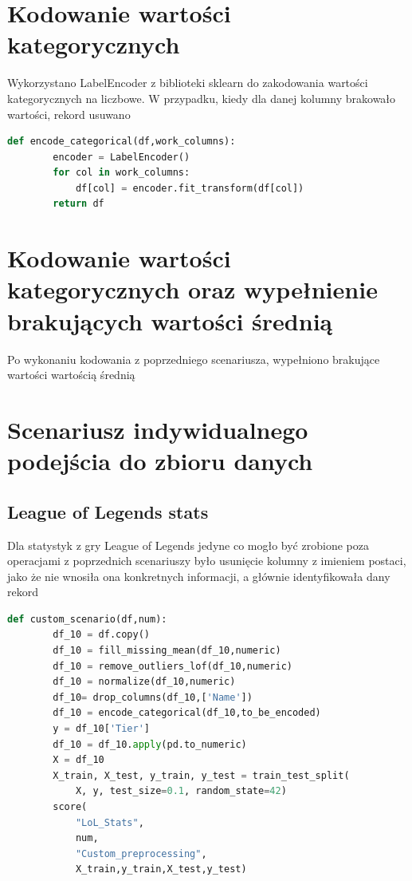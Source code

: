 \documentclass{book}
\begin{document}
\section{Kodowanie wartości kategorycznych}
Wykorzystano LabelEncoder z biblioteki sklearn do 
zakodowania wartości kategorycznych na liczbowe. 
W przypadku, kiedy dla danej kolumny brakowało wartości, 
rekord usuwano

\begin{lstlisting}[language=Python, caption={Usuwanie wartości 
    odstających}, captionpos=b]
    def encode_categorical(df,work_columns):
        encoder = LabelEncoder()
        for col in work_columns:
            df[col] = encoder.fit_transform(df[col])
        return df
\end{lstlisting}

\section{Kodowanie wartości kategorycznych oraz wypełnienie 
brakujących wartości średnią}
Po wykonaniu kodowania z poprzedniego scenariusza, 
wypełniono brakujące wartości wartością średnią
\section{Scenariusz indywidualnego podejścia do zbioru danych}
\subsection{League of Legends stats}
Dla statystyk z gry League of Legends jedyne co mogło być zrobione 
poza operacjami z poprzednich scenariuszy było usunięcie kolumny z 
imieniem postaci, jako że nie wnosiła ona konkretnych informacji, 
a głównie identyfikowała dany rekord

\begin{lstlisting}[language=Python, caption={Indywidualny 
    scenariusz dla zestawu danych LoL Stats}, captionpos=b]
    def custom_scenario(df,num):
        df_10 = df.copy()
        df_10 = fill_missing_mean(df_10,numeric)
        df_10 = remove_outliers_lof(df_10,numeric)
        df_10 = normalize(df_10,numeric)
        df_10= drop_columns(df_10,['Name'])
        df_10 = encode_categorical(df_10,to_be_encoded)
        y = df_10['Tier']
        df_10 = df_10.apply(pd.to_numeric)
        X = df_10
        X_train, X_test, y_train, y_test = train_test_split(
            X, y, test_size=0.1, random_state=42)
        score(
            "LoL_Stats",
            num,
            "Custom_preprocessing",
            X_train,y_train,X_test,y_test)
\end{lstlisting}
\end{document}
